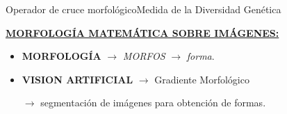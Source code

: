 \documentclass[10pt]{beamer}
\begin{document}
\begin{frame}{Operador de cruce morfol\'ogico}{Medida de la Diversidad Gen\'etica}
	\begin{center}
		\underline{\textbf{MORFOLOG\'IA MATEM\'ATICA SOBRE IM\'AGENES: }}
		
		\begin{itemize}
			\item \textbf{MORFOLOG\'IA} $\rightarrow$ \textit{MORFOS} $\rightarrow$ \emph{forma}.
			\item \textbf{VISION ARTIFICIAL} $\rightarrow$ Gradiente Morfol\'ogico \par
			$\rightarrow$ segmentaci\'on de im\'agenes para obtenci\'on de formas.
		\end{itemize}
		
			
		\end{center}
	\end{frame}
	
	
\end{document}
